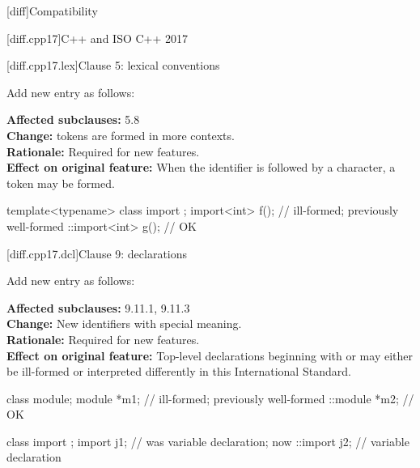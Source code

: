 \setcounter{chapter}{2}
[diff]{Compatibility}%

\setcounter{section}{4}
[diff.cpp17]{C++ and ISO C++ 2017}%

\setcounter{subsection}{0}
[diff.cpp17.lex]{Clause 5: lexical conventions}%

\noindent
Add new entry as follows:
\begin{std.txt}
\color{addclr}
\textbf{Affected subclauses:} 5.8\\
\textbf{Change:}  tokens are formed in more contexts.\\
\textbf{Rationale:} Required for new features.\\
\textbf{Effect on original feature:}
When the identifier 
is followed by a \tcode{<} character,
a  token may be formed.
\begin{example}
\begin{codeblock}
template<typename> class import {};
import<int> f();                // ill-formed; previously well-formed
::import<int> g();              // OK
\end{codeblock}
\end{example}
\end{std.txt}

\setcounter{subsection}{2}
[diff.cpp17.dcl]{Clause 9: declarations}%

\noindent
Add new entry as follows:
\begin{std.txt}
\color{addclr}
\textbf{Affected subclauses:} 9.11.1, 9.11.3\\
\textbf{Change:} New identifiers with special meaning.\\
\textbf{Rationale:} Required for new features.\\
\textbf{Effect on original feature:}
Top-level declarations beginning with
 or  may
either be ill-formed or interpreted differently
in this International Standard.
\begin{example}
\begin{codeblock}
class module;
module *m1;       // ill-formed; previously well-formed
::module *m2;     // OK

class import {};
import j1;        // was variable declaration; now 
::import j2;      // variable declaration
\end{codeblock}
\end{example}
\end{std.txt}
